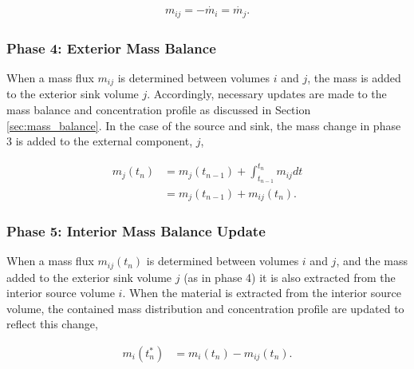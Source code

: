\begin{align}
m_{ij}= -\dot{m_i} = \dot{m_j}.
\end{align}

\subsubsection{Phase 4: Exterior Mass Balance}

When a mass flux $m_{ij}$ is determined between volumes $i$ and $j$, the
mass is added to the exterior sink volume $j$. Accordingly, necessary updates
are made to the mass balance and concentration profile as discussed in Section
\ref{sec:mass_balance}. In the case of the source and sink, the mass change in
phase 3 is added to the external component, $j$,

\begin{align}
        m_j(t_n) &= m_j(t_{n-1}) + \int_{t_{n-1}}^{t_n}m_{ij}dt\\
                 &= m_j(t_{n-1}) + m_{ij}(t_n).
\end{align}

\subsubsection{Phase 5: Interior Mass Balance Update}

When a mass flux $m_{ij}(t_n)$ is determined between volumes $i$ and $j$, and
the mass added to the exterior sink volume $j$ (as in phase 4) it is also
extracted from the interior source volume $i$.  When the material is extracted
from the interior source volume, the contained mass distribution and
concentration profile are updated to reflect this change,

\begin{align}
  m_{i}(t_n^*) &= m_i(t_n) - m_{ij}(t_n).
\end{align}

